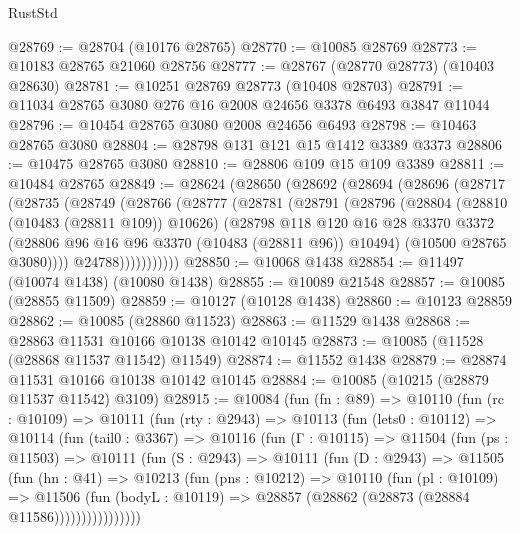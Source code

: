 \begin{lexlean}{RustStd}
\begin{coremodule}
@28769 := @28704 (@10176 @28765)
@28770 := @10085 @28769
@28773 := @10183 @28765 @21060 @28756
@28777 := @28767 (@28770 @28773) (@10403 @28630)
@28781 := @10251 @28769 @28773 (@10408 @28703)
@28791 := @11034 @28765 @3080 @276 @16 @2008 @24656 @3378 @6493 @3847 @11044
@28796 := @10454 @28765 @3080 @2008 @24656 @6493
@28798 := @10463 @28765 @3080
@28804 := @28798 @131 @121 @15 @1412 @3389 @3373
@28806 := @10475 @28765 @3080
@28810 := @28806 @109 @15 @109 @3389
@28811 := @10484 @28765
@28849 := @28624
    (@28650
      (@28692
        (@28694
          (@28696
            (@28717
              (@28735
                (@28749
                  (@28766
                    (@28777
                      (@28781
                        (@28791
                          (@28796
                            (@28804
                              (@28810 (@10483 (@28811 @109)) @10626)
                              (@28798
                                @118
                                @120
                                @16
                                @28
                                @3370
                                @3372
                                (@28806 @96 @16 @96 @3370 (@10483 (@28811 @96)) @10494)
                                (@10500 @28765 @3080))))
                          @24788)))))))))))
@28850 := @10068 @1438
@28854 := @11497 (@10074 @1438) (@10080 @1438)
@28855 := @10089 @21548
@28857 := @10085 (@28855 @11509)
@28859 := @10127 (@10128 @1438)
@28860 := @10123 @28859
@28862 := @10085 (@28860 @11523)
@28863 := @11529 @1438
@28868 := @28863 @11531 @10166 @10138 @10142 @10145
@28873 := @10085 (@11528 (@28868 @11537 @11542) @11549)
@28874 := @11552 @1438
@28879 := @28874 @11531 @10166 @10138 @10142 @10145
@28884 := @10085 (@10215 (@28879 @11537 @11542) @3109)
@28915 := @10084
    (fun (fn : @89) =>
    @10110
      (fun (rc : @10109) =>
      @10111
        (fun (rty : @2943) =>
        @10113
          (fun (lets0 : @10112) =>
          @10114
            (fun (tail0 : @3367) =>
            @10116
              (fun (Γ : @10115) =>
              @11504
                (fun (ps : @11503) =>
                @10111
                  (fun (S : @2943) =>
                  @10111
                    (fun (D : @2943) =>
                    @11505
                      (fun (hn : @41) =>
                      @10213
                        (fun (pns : @10212) =>
                        @10110
                          (fun (pl : @10109) =>
                          @11506
                            (fun (bodyL : @10119) =>
                            @28857 (@28862 (@28873 (@28884 @11586))))))))))))))))

\end{coremodule}
\end{lexlean}
